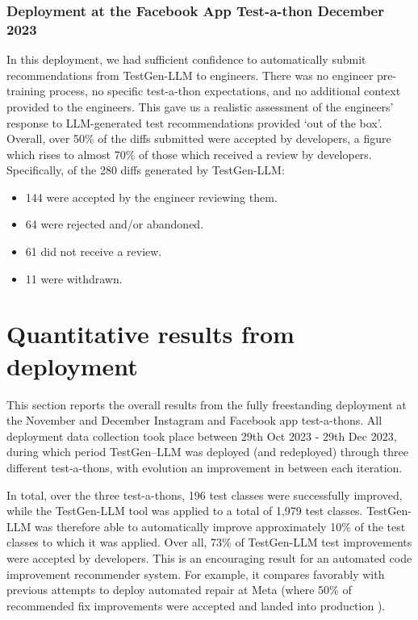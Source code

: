 \documentclass[sigconf,screen]{acmart}
\begin{document}
\subsubsection{Deployment at the Facebook App Test-a-thon December 2023}
In this deployment, we had sufficient confidence to automatically submit recommendations from TestGen-LLM to engineers.
There was no engineer pre-training process, no specific test-a-thon expectations, and no additional context provided to the engineers.
This gave us a realistic assessment of the engineers' response to LLM-generated test recommendations provided `out of the box'.
Overall, over 50\% of the diffs submitted were accepted by developers, a figure which rises to almost 70\% of those which received a review by developers.
Specifically, of the 280 diffs generated by TestGen-LLM:

\begin{itemize}
\item 144 were accepted by the engineer reviewing them.
\item 64 were rejected and/or abandoned.
\item 61 did not receive a review.
\item 11 were withdrawn.
\end{itemize}





\section{Quantitative results from deployment}
This section reports the overall results from the fully freestanding deployment at the November and December Instagram and Facebook app test-a-thons.
All deployment data collection took place between 29th Oct 2023 - 29th Dec 2023, during which period TestGen–LLM was deployed (and redeployed) through three different test-a-thons, with  evolution  an improvement in between each iteration.


In total, over the three test-a-thons,
196 test classes were successfully improved, while the  TestGen-LLM tool was applied to a total of 1,979 test classes. 
TestGen-LLM was therefore able to automatically improve approximately 10\% of the test classes to which it was applied. 
Over all, 73\% of TestGen-LLM test improvements were accepted by developers.
This is an encouraging result for an automated code improvement recommender system. 
For example, it compares favorably with previous attempts to deploy automated repair at Meta (where 50\% of recommended fix improvements were accepted and landed into production \cite{ametal:sapfix}).
\end{document}
